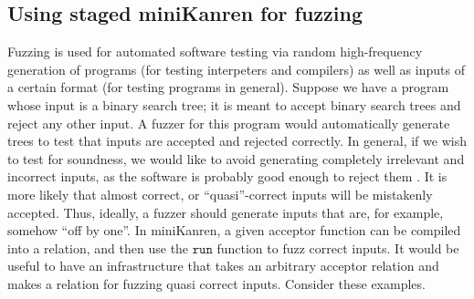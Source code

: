 \documentclass[11pt]{article}
\theoremstyle{definition}
\newcommand{\code}[1]{\texttt{#1}}
\newcommand\tab[1][1cm]{\hspace*{#1}}
\begin{document}
\subsection{Using staged miniKanren for fuzzing}
\tab Fuzzing is used for automated software testing via random high-frequency generation of programs (for testing interpeters and compilers) as well as inputs of a certain format (for testing programs in general). Suppose we have a program whose input is a binary search tree; it is meant to accept binary search trees and reject any other input. A fuzzer for this program would automatically generate trees to test that inputs are accepted and rejected correctly. In general, if we wish to test for soundness, we would like to avoid generating completely irrelevant and incorrect inputs, as the software is probably good enough to reject them \cite{dewey2015fuzzing}. It is more likely that almost correct, or ``quasi''-correct inputs will be mistakenly accepted. Thus, ideally, a fuzzer should generate inputs that are, for example, somehow ``off by one''. In miniKanren, a given acceptor function can be compiled into a relation, and then use the $\code{run}$ function to fuzz correct inputs. It would be useful to have an infrastructure that takes an arbitrary acceptor relation and makes a relation for fuzzing quasi correct inputs. Consider these examples.
\end{document}
